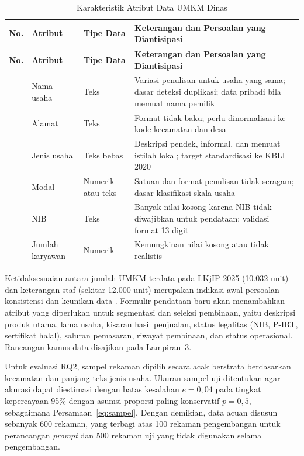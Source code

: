 \documentclass[12pt,a4paper]{report}
\begin{document}
{\footnotesize
\setlength{\tabcolsep}{4pt}
\renewcommand{\arraystretch}{1.15}
\begin{longtable}{|>{\centering\arraybackslash}p{}|L{0.17\textwidth}|L{0.17\textwidth}|L{0.53\textwidth}|}
\caption{Karakteristik Atribut Data UMKM Dinas}
\label{tab:dataset}\\
\hline
\textbf{No.} & \textbf{Atribut} & \textbf{Tipe Data} & \textbf{Keterangan dan Persoalan yang Diantisipasi} \\ \hline
\endfirsthead
\hline
\textbf{No.} & \textbf{Atribut} & \textbf{Tipe Data} & \textbf{Keterangan dan Persoalan yang Diantisipasi} \\ \hline
{} & Nama usaha & Teks & Variasi penulisan untuk usaha yang sama; dasar deteksi duplikasi; data pribadi bila memuat nama pemilik \\  & Alamat & Teks & Format tidak baku; perlu dinormalisasi ke kode kecamatan dan desa \\  & Jenis usaha & Teks bebas & Deskripsi pendek, informal, dan memuat istilah lokal; target standardisasi ke KBLI 2020 \\  & Modal & Numerik atau teks & Satuan dan format penulisan tidak seragam; dasar klasifikasi skala usaha \\  & NIB & Teks & Banyak nilai kosong karena NIB tidak diwajibkan untuk pendataan; validasi format 13 digit \\  & Jumlah karyawan & Numerik & Kemungkinan nilai kosong atau tidak realistis \\ \hline
\end{longtable}
}

Ketidaksesuaian antara jumlah UMKM terdata pada LKjIP 2025 (10.032 unit) dan keterangan staf (sekitar 12.000 unit) merupakan indikasi awal persoalan konsistensi dan keunikan data \cite{lkjip2025toba,wawancarastaf2026}. Formulir pendataan baru akan menambahkan atribut yang diperlukan untuk segmentasi dan seleksi pembinaan, yaitu deskripsi produk utama, lama usaha, kisaran hasil penjualan, status legalitas (NIB, P-IRT, sertifikat halal), saluran pemasaran, riwayat pembinaan, dan status operasional. Rancangan kamus data disajikan pada Lampiran~3.

Untuk evaluasi RQ2, sampel rekaman dipilih secara acak berstrata berdasarkan kecamatan dan panjang teks jenis usaha. Ukuran sampel uji ditentukan agar akurasi dapat diestimasi dengan batas kesalahan $e = 0{,}04$ pada tingkat kepercayaan 95\% dengan asumsi proporsi paling konservatif $p = 0{,}5$, sebagaimana Persamaan~\eqref{eq:sampel}. Dengan demikian, data acuan disusun sebanyak 600 rekaman, yang terbagi atas 100 rekaman pengembangan untuk perancangan \textit{prompt} dan 500 rekaman uji yang tidak digunakan selama pengembangan.
\end{document}
